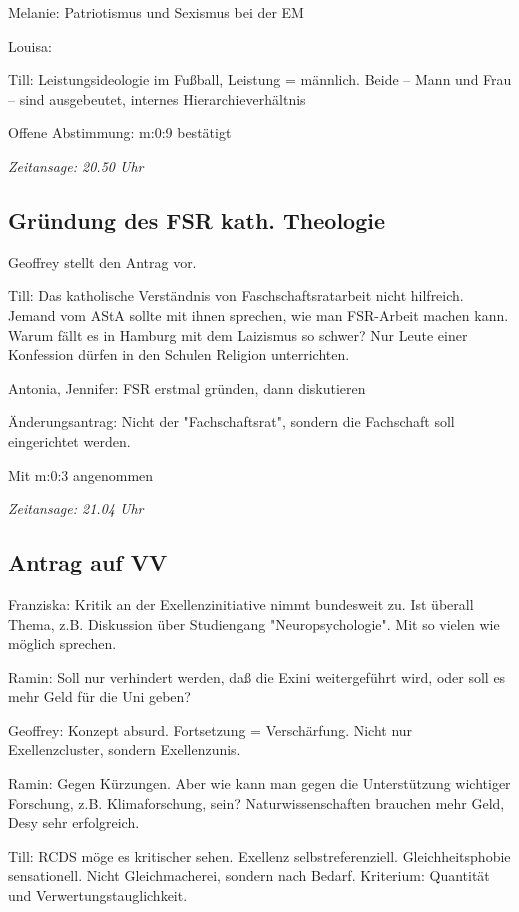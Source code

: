 \documentclass[ngerman,headheight=70pt]{scrartcl}
\begin{document}
    Melanie: Patriotismus und Sexismus bei der EM

    Louisa:

    Till: Leistungsideologie im Fußball, Leistung = männlich.
    Beide – Mann und Frau – sind ausgebeutet, internes Hierarchieverhältnis

    Offene Abstimmung: m:0:9 bestätigt

    \textit{Zeitansage: 20.50 Uhr}

    \subsection{Gründung des FSR kath. Theologie}

    Geoffrey stellt den Antrag vor.

    Till: Das katholische Verständnis von Faschschaftsratarbeit nicht hilfreich.
    Jemand vom AStA sollte mit ihnen sprechen, wie man FSR-Arbeit machen kann.
    Warum fällt es in Hamburg mit dem Laizismus so schwer? Nur Leute einer
    Konfession dürfen in den Schulen Religion unterrichten.

    Antonia, Jennifer: FSR erstmal gründen, dann diskutieren

    Änderungsantrag: Nicht der "Fachschaftsrat", sondern die Fachschaft soll eingerichtet werden.

    Mit m:0:3 angenommen

    \textit{Zeitansage: 21.04 Uhr}

    \subsection{Antrag auf VV}

    Franziska: Kritik an der Exellenzinitiative nimmt bundesweit zu. Ist überall
    Thema, z.B. Diskussion über Studiengang "Neuropsychologie". Mit so vielen wie
    möglich sprechen.

    Ramin: Soll nur verhindert werden, daß die Exini weitergeführt wird, oder
    soll es mehr Geld für die Uni geben?

    Geoffrey: Konzept absurd. Fortsetzung = Verschärfung. Nicht nur Exellenzcluster,
    sondern Exellenzunis.

    Ramin: Gegen Kürzungen. Aber wie kann man gegen die Unterstützung wichtiger
    Forschung, z.B. Klimaforschung, sein?
    Naturwissenschaften brauchen mehr Geld, Desy sehr erfolgreich.

    Till: RCDS möge es kritischer sehen. Exellenz selbstreferenziell.
    Gleichheitsphobie sensationell. Nicht Gleichmacherei, sondern nach Bedarf.
    Kriterium: Quantität und Verwertungstauglichkeit.
\end{document}
